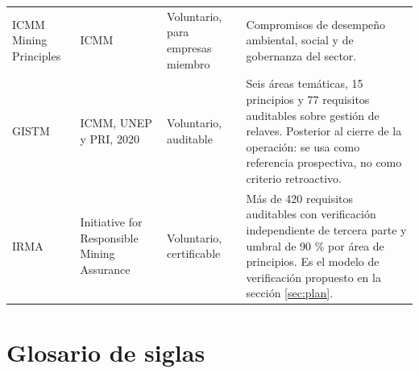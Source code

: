 \begin{footnotesize}
\begin{longtable}{@{}L{3.1cm} L{2.2cm} L{2.4cm} L{6.8cm}@{}}
  {ICMM} Mining Principles & {ICMM} & Voluntario, para empresas miembro &
  Compromisos de desempeño ambiental, social y de gobernanza del sector. \\
  \addlinespace

  {GISTM} & {ICMM}, {UNEP} y {PRI}, 2020 & Voluntario, auditable &
  Seis áreas temáticas, 15 principios y 77 requisitos auditables sobre gestión de
  relaves. Posterior al cierre de la operación: se usa como referencia
  prospectiva, no como criterio retroactivo. \\
  \addlinespace

  {IRMA} & Initiative for Responsible Mining Assurance & Voluntario, certificable &
  Más de 420 requisitos auditables con verificación independiente de tercera
  parte y umbral de 90 \% por área de principios. Es el modelo de verificación
  propuesto en la sección \ref{sec:plan}. \\

\end{longtable}
\end{footnotesize}

\section{Glosario de siglas}
\label{anexo:glosario}

